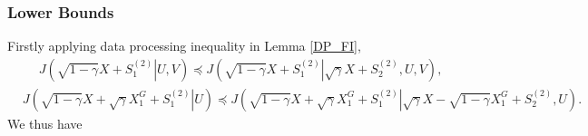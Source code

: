 \documentclass[journal,final, onecolumn]{IEEEtran}
\begin{document}
\subsubsection{Lower Bounds}
Firstly applying data processing inequality in Lemma \ref{DP_FI},
\begin{align}
&J   \left(\left.  \sqrt{1-\gamma}X+S^{(2)}_{1} \right|   U,V  \right) \preceq J   \left(\left.  \sqrt{1-\gamma}X+S^{(2)}_{1} \right| \sqrt{\gamma}X+S^{(2)}_2,  U,V  \right),
\end{align}
\begin{align}
 &  J   \left( \left. \sqrt{1-\gamma}X+\sqrt{\gamma}X^{G}_{1}+S^{(2)}_{1} \right|  U  \right)
  \preceq J   \left( \left. \sqrt{1-\gamma}X+\sqrt{\gamma}X^{G}_{1}+S^{(2)}_{1} \right| \sqrt{\gamma}X-\sqrt{1-\gamma}X^{G}_{1}+S^{(2)}_{2},  U  \right).
\end{align}
We thus have
\end{document}
